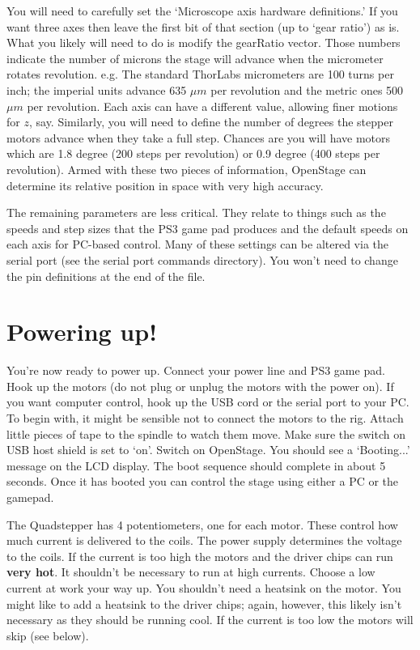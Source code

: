 \documentclass[11pt]{report} %
\begin{document}
You will need to carefully set the `Microscope axis hardware definitions.' If you want three axes then leave the first bit of that section (up to `gear ratio') as is. What you likely will need to do is modify the gearRatio vector. Those numbers indicate the number of microns the stage will advance when the micrometer rotates revolution. e.g. The standard ThorLabs micrometers are 100 turns per inch; the imperial units advance 635 $\mu m$ per revolution and the metric ones 500 $\mu m$ per revolution. Each axis can have a different value, allowing finer motions for $z$, say. Similarly, you will need to define the number of degrees the stepper motors advance when they take a full step. Chances are you will have motors which are 1.8 degree (200 steps per revolution) or 0.9 degree (400 steps per revolution). Armed with these two pieces of information, OpenStage can determine its relative position in space with very high accuracy. 

The remaining parameters are less critical. They relate to things such as the speeds and step sizes that the PS3 game pad produces and the default speeds on each axis for PC-based control. Many of these settings can be altered via the serial port (see the serial port commands directory). You won't need to change the pin definitions at the end of the file. 

\section{Powering up!}
You're now ready to power up. Connect your power line and PS3 game pad. Hook up the motors (do not plug or unplug the motors with the power on). If you want computer control, hook up the USB cord or the serial port to your PC. To begin with, it might be sensible not to connect the motors to the rig. Attach little pieces of tape to the spindle to watch them move. Make sure the switch on USB host shield is set to `on'. Switch on OpenStage. You should see a `Booting...' message on the LCD display. The boot sequence should complete in about 5 seconds. Once it has booted you can control the stage using either a PC or the gamepad. 

The Quadstepper has 4 potentiometers, one for each motor. These control how much current is delivered to the coils. The power supply determines the voltage to the coils. If the current is too high the motors and the driver chips can run \textbf{very hot}. It shouldn't be necessary to run at high currents. Choose a low current at work your way up. You shouldn't need a heatsink on the motor. You might like to add a heatsink to the driver chips; again, however, this likely isn't necessary as they should be running cool. If the current is too low the motors will skip (see below).
\end{document}
